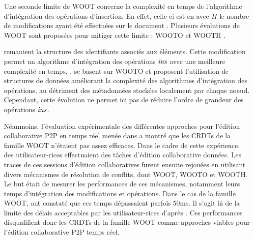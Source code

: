 Une seconde limite de WOOT concerne la complexité en temps de l'algorithme d'intégration des opérations d'insertion.
En effet, celle-ci est en  avec $H$ le nombre de modifications ayant été effectuées sur le document \cite{2011-evaluation-crdts-ahmed-nacer}.
Plusieurs évolutions de WOOT sont proposées pour mitiger cette limite : WOOTO \cite{2007-wooto-weiss} et WOOTH \cite{2011-evaluation-crdts-ahmed-nacer}.

\textcite{2007-wooto-weiss} remanient la structure des identifiants associés aux éléments.
Cette modification permet un algorithme d'intégration des opérations $\mathit{ins}$ avec une meilleure complexité en temps, .
\textcite{2011-evaluation-crdts-ahmed-nacer} se basent sur WOOTO et proposent l'utilisation de structures de données améliorant la complexité des algorithmes d'intégration des opérations, au détriment des métadonnées stockées localement par chaque noeud.
Cependant, cette évolution ne permet ici pas de réduire l'ordre de grandeur des opérations $\mathit{ins}$.

Néanmoins, l'évaluation expérimentale des différentes approches pour l'édition collaborative \ac{P2P} en temps réel menée dans \cite{2011-evaluation-crdts-ahmed-nacer} a montré que les \acp{CRDT} de la famille WOOT n'étaient pas assez efficaces.
Dans le cadre de cette expérience, des utilisateur-rices effectuaient des tâches d'édition collaborative données.
Les traces de ces sessions d'édition collaboratives furent ensuite rejouées en utilisant divers mécanismes de résolution de conflits, dont WOOT, WOOTO et WOOTH.
Le but était de mesurer les performances de ces mécanismes, notamment leurs temps d'intégration des modifications et opérations.
Dans le cas de la famille WOOT, \citeauthor{2011-evaluation-crdts-ahmed-nacer} ont constaté que ces temps dépassaient parfois 50ms.
Il s'agit là de la limite des délais acceptables par les utilisateur-rices d'après \cite{1984-human-performance-with-computers-shneiderman,2007-modeling-effects-delayed-feedback-jay}.
Ces performances disqualifient donc les \acp{CRDT} de la famille WOOT comme approches viables pour l'édition collaborative \ac{P2P} temps réel.
